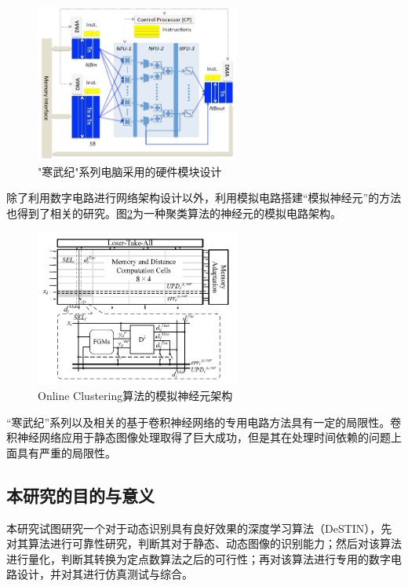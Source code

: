 \begin{figure}[htbp]
   \centering
   \includegraphics[width=0.6\textwidth]{DianNao.png} %
   \caption{"寒武纪"系列电脑采用的硬件模块设计}
   \label{fig:diannao}
\end{figure}

除了利用数字电路进行网络架构设计以外，利用模拟电路搭建“模拟神经元”的方法也得到了相关的研究。图\ref{fig:clustering}\cite{Lu2014An}为一种聚类算法的神经元的模拟电路架构。

\begin{figure}[htbp]
   \centering
   \includegraphics[width=0.6\textwidth]{OnlineClustering.png} %
   \caption{Online Clustering算法的模拟神经元架构}
   \label{fig:clustering}
\end{figure}

“寒武纪”系列以及相关的基于卷积神经网络的专用电路方法具有一定的局限性。卷积神经网络应用于静态图像处理取得了巨大成功，但是其在处理时间依赖的问题上面具有严重的局限性。

\subsection{本研究的目的与意义}
本研究试图研究一个对于动态识别具有良好效果的深度学习算法（DeSTIN），先对其算法进行可靠性研究，判断其对于静态、动态图像的识别能力；然后对该算法进行量化，判断其转换为定点数算法之后的可行性；再对该算法进行专用的数字电路设计，并对其进行仿真测试与综合。

